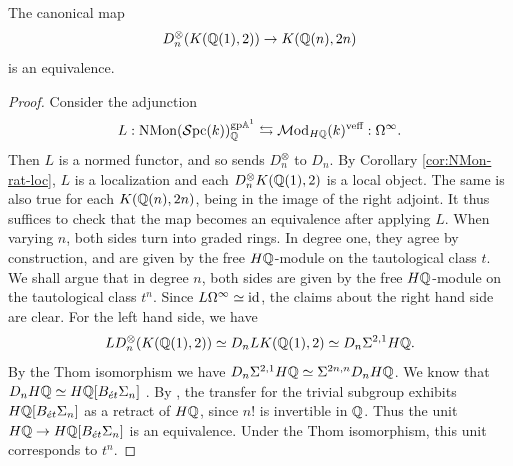 \documentclass{amsart}
\numberwithin{proposition}{section}
\numberwithin{equation}{section}
\def\NMon{\mathrm{NMon}}
\begin{document}
\begin{lemma} \label{lemm:key1}
The canonical map \[ D_n^\otimes(K(\mathbb{Q}(1),2)) \to K(\mathbb{Q}(n),2n) \] is an equivalence.
\end{lemma}
\begin{proof}
Consider the adjunction \[ L: \NMon(\Spc(k))^{\gp\A^1}_\Q \adj \Mod_{H\Q}(k)^\veff: \Omega^\infty. \]
Then $L$ is a normed functor, and so sends $D_n^\otimes$ to $D_n$.
By Corollary \ref{cor:NMon-rat-loc}, $L$ is a localization and each $D_n^\otimes K(\mathbb{Q}(1),2)$ is a local object.
The same is also true for each $K(\mathbb{Q}(n),2n)$, being in the image of the right adjoint.
It thus suffices to check that the map becomes an equivalence after applying $L$.
When varying $n$, both sides turn into graded rings.
In degree one, they agree by construction, and are given by the free $H\mathbb{Q}$-module on the tautological class $t$.
We shall argue that in degree $n$, both sides are given by the free $H\mathbb{Q}$-module on the tautological class $t^n$.
Since $L\Omega^\infty \simeq \operatorname{id}$, the claims about the right hand side are clear.
For the left hand side, we have \[ L D_n^\otimes(K(\mathbb{Q}(1),2)) \simeq D_n L K(\mathbb{Q}(1),2) \simeq D_n \Sigma^{2,1} H\mathbb{Q}. \]
By the Thom isomorphism \cite[Proposition~5.37]{bachmann-colimits} we have $D_n \Sigma^{2,1}H\mathbb{Q} \simeq \Sigma^{2n,n} D_n H\mathbb{Q}$.
We know that $D_n H\mathbb{Q} \simeq H\mathbb{Q}[B_{\acute{e}t}\Sigma_n]$ \cite[Example~5.8 and Proposition~5.14]{bachmann-colimits}.
By \cite[Proposition~5.39]{bachmann-colimits}, the transfer for the trivial subgroup exhibits $H\mathbb{Q}[B_{\acute{e}t}\Sigma_n]$ as a retract of $H\mathbb{Q}$, since $n!$ is invertible in $\mathbb{Q}$.
Thus the unit $H\mathbb{Q} \to H\mathbb{Q}[B_{\acute{e}t}\Sigma_n]$ is an equivalence.
Under the Thom isomorphism, this unit corresponds to $t^n$.
\end{proof}
\end{document}
